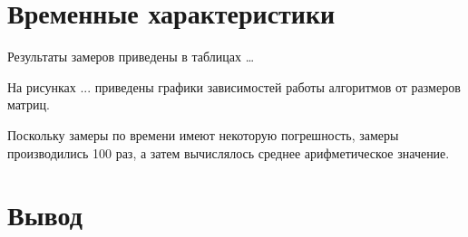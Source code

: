 \clearpage

\section{Временные характеристики}

Результаты замеров приведены в таблицах \dots

На рисунках ... приведены графики зависимостей работы алгоритмов от размеров матриц.

Поскольку замеры по времени имеют некоторую погрешность, замеры производились 100 раз, а затем вычислялось среднее арифметическое значение.



\section*{Вывод}